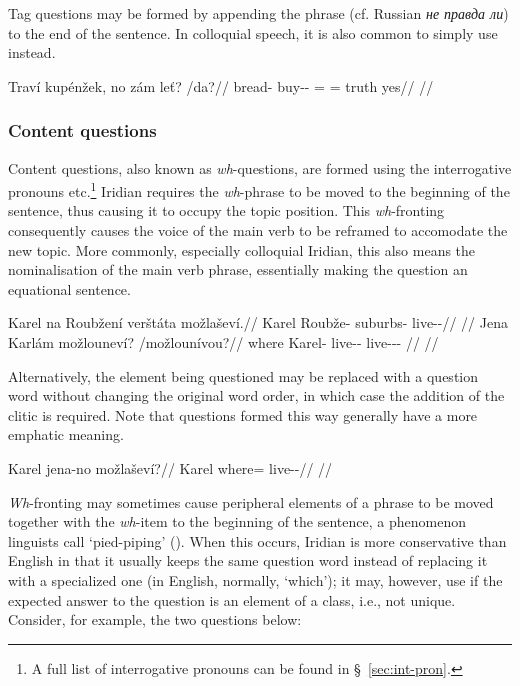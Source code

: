 Tag questions may be formed by appending the phrase  (cf. Russian \textit{\cyrtext не правда ли}) to the end of the sentence. In colloquial speech, it is also common to simply use  instead.

\pex
\begingl
\gla Traví kupénžek, no zám le\v{t}? /da?//
\glb bread-\Gen{} buy-\Av{}-\Pf{} \Q{}= \Neg{}= truth yes//
\glft {}//
\endgl
\xe

\subsubsection{Content questions}

Content questions, also known as \emph{wh}-questions, are formed using the interrogative pronouns    etc.\footnote{
  A full list of interrogative pronouns can be found in \S~\ref{sec:int-pron}.
} Iridian requires the \emph{wh}-phrase to be moved to the beginning of the sentence, thus causing it to occupy the topic position. This \emph{wh}-fronting consequently causes the voice of the main verb to be reframed to accomodate the new topic. More commonly, especially colloquial Iridian, this also means the nominalisation of the main verb phrase, essentially making the question an equational sentence.

\pex
\a\begingl
\gla Karel na Roubžení verštáta možlaševí.//
\glb Karel \Loc{} Roubže-\Gen{} suburbs-\Acc{} live-\Av{}-\Cont{}//
\glft {}//
\endgl
\a\begingl
\gla Jena Karlám možlouneví? /možlounívou?//
\glb where Karel-\Agt{} live-\Lv{}-\Cont{} live-\Lv{}-\Cont{}-\Nz{} //
\glft {}//
\endgl
\xe

Alternatively, the element being questioned may be replaced with a question word without changing the original word order, in which case the addition of the clitic  is required. Note that questions formed this way generally have a more emphatic meaning.

\pex
\begingl
\gla Karel jena-no možlaševí?//
\glb Karel where=\Q{} live-\Av{}-\Cont{}//
\glft {}//
\endgl
\xe


\emph{Wh}-fronting may sometimes cause peripheral elements of a phrase to be moved together with the \emph{wh}-item to the beginning of the sentence, a phenomenon linguists call `pied-piping' (\cite[263-4]{ross1967}). When this occurs, Iridian is more conservative than English in that it usually keeps the same question word instead of replacing it with a specialized one (in English, normally, `which'); it may, however, use  if the expected answer to the question is an element of a class, i.e., not unique. Consider, for example, the two questions below:


